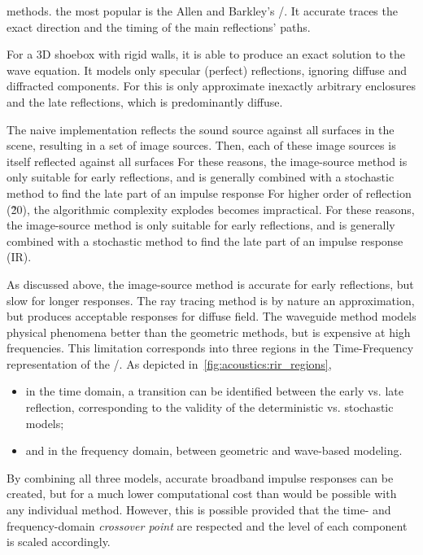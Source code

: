  methods.
the most popular is the Allen and Barkley's \ISMf/\cite{Allen1979image}.
It accurate traces the exact direction and the timing of the main reflections' paths.

For a 3D shoebox with rigid walls, it is able to produce an exact solution to the wave equation.
It models only specular (perfect) reflections, ignoring diffuse and diffracted components.
For this is only approximate inexactly arbitrary enclosures and the late reflections, which is predominantly diffuse.

The naive implementation reflects the sound source against all surfaces in the scene, resulting in a set of image sources. Then, each of these image sources is itself reflected against all surfaces
For these reasons, the image-source method is only suitable for early reflections, and is generally combined with a stochastic method to find the late part of an impulse response
For higher order of reflection (\~20), the algorithmic complexity explodes becomes impractical.
For these reasons, the image-source method is only suitable for early reflections, and is generally combined with a stochastic method to find the late part of an impulse response (IR).

As discussed above, the image-source method is accurate for early reflections, but slow for longer responses.
The ray tracing method is by nature an approximation, but produces acceptable responses for diffuse field.
The waveguide method models physical phenomena better than the geometric methods, but is expensive at high frequencies.
This limitation corresponds into three regions in the Time-Frequency representation of the \RIR/.
As depicted in~\cref{fig:acoustics:rir_regions},
\begin{itemize}
    \item in the time domain, a transition can be identified between the early vs. late reflection, corresponding to the validity of the deterministic vs. stochastic models;
    \item and in the frequency domain, between geometric and wave-based modeling.
\end{itemize}

By combining all three models, accurate broadband impulse responses can be created,
but for a much lower computational cost than would be possible with any individual method.
However, this is possible provided that the time- and frequency-domain
\textit{crossover point} are respected and the level of each component is scaled accordingly.

